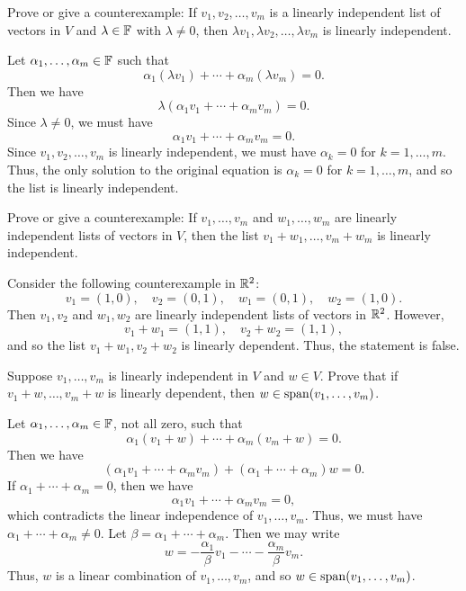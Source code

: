 \begin{exc}
\begin{exercise}
Prove or give a counterexample: If $v_1,v_2,\dots,v_m$ is a linearly
independent list of vectors in $V$ and $\lambda\in\mathbb{F}$ with $\lambda\ne0$, then
$\lambda v_1,\lambda v_2,\dots,\lambda v_m$ is linearly independent.
\end{exercise}
\begin{solution}
Let $\alpha_1,\dots,\alpha_m\in\mathbb{F}$ such that
\[ \alpha_1(\lambda v_1)+\cdots+\alpha_m(\lambda v_m)=0. \]
Then we have
\[ \lambda(\alpha_1v_1+\cdots+\alpha_mv_m)=0. \]
Since $\lambda\ne0$, we must have
\[ \alpha_1v_1+\cdots+\alpha_mv_m=0. \]
Since $v_1,v_2,\dots,v_m$ is linearly independent, we must have $\alpha_k=0$
for $k=1,\dots,m$. Thus, the only solution to the original equation is
$\alpha_k=0$ for $k=1,\dots,m$, and so the list is linearly independent.
\end{solution}

\begin{exercise}
Prove or give a counterexample: If $v_1,\dots,v_m$ and $w_1,\dots,w_m$ are
linearly independent lists of vectors in $V$, then the list
$v_1+w_1,\dots,v_m+w_m$ is linearly independent.
\end{exercise}
\begin{solution}
Consider the following counterexample in $\mathbb{R}^2$:
\[ v_1=(1,0), \quad v_2=(0,1), \quad w_1=(0,1), \quad w_2=(1,0). \]
Then $v_1,v_2$ and $w_1,w_2$ are linearly independent lists of vectors in
$\mathbb{R}^2$. However,
\[ v_1+w_1=(1,1), \quad v_2+w_2=(1,1), \]
and so the list $v_1+w_1,v_2+w_2$ is linearly dependent. Thus, the statement
is false.
\end{solution}

\begin{exercise}
Suppose $v_1,\dots,v_m$ is linearly independent in $V$ and $w\in V$. Prove that
if $v_1+w,\dots,v_m+w$ is linearly dependent, then $w\in\operatorname{span}(v_1,\dots,v_m)$.
\end{exercise}
\begin{solution}
Let $\alpha_1,\dots,\alpha_m\in\mathbb{F}$, not all zero, such that
\[ \alpha_1(v_1+w)+\cdots+\alpha_m(v_m+w)=0. \]
Then we have
\[ (\alpha_1v_1+\cdots+\alpha_mv_m)+(\alpha_1+\cdots+\alpha_m)w=0. \]
If $\alpha_1+\cdots+\alpha_m=0$, then we have
\[ \alpha_1v_1+\cdots+\alpha_mv_m=0, \]
which contradicts the linear independence of $v_1,\dots,v_m$. Thus, we must
have $\alpha_1+\cdots+\alpha_m\ne0$. Let $\beta=\alpha_1+\cdots+\alpha_m$.
Then we may write
\[ w = -\frac{\alpha_1}{\beta}v_1-\cdots-\frac{\alpha_m}{\beta}v_m. \]
Thus, $w$ is a linear combination of $v_1,\dots,v_m$, and so
$w\in\operatorname{span}(v_1,\dots,v_m)$.
\end{solution}


\end{exc}
